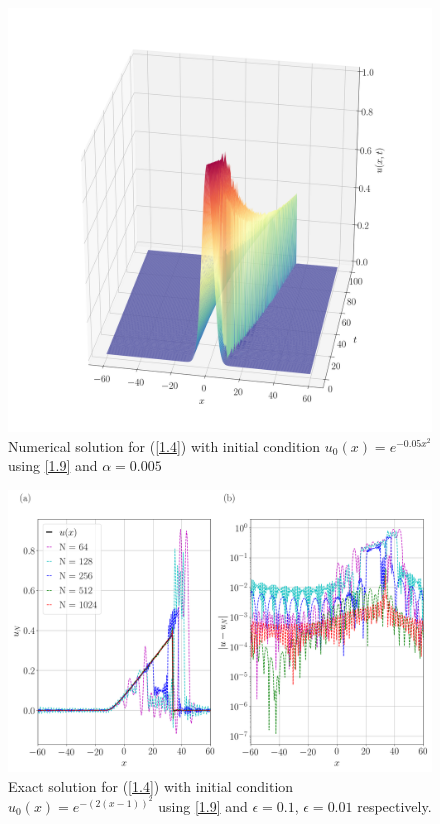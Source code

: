 	\begin{figure}
		\includegraphics[width=\textwidth]{Figures/Collocation/Graphics/eps=0.005/Numerical_Solution_alpha=0005.png}
		\caption{Numerical solution for (\ref{1.4}) with initial condition $u_0 (x) = e^{- 0.05 x^2}$ using \ref{1.9} and $\alpha = 0.005$}
		\label{Exact_Solution}
	\end{figure}
	\begin{figure}
		\includegraphics[width=\textwidth]{Figures/Collocation/Graphics/eps=0.005/Numerical_Solution_alpha=0005_T=100.png}
		\caption{Exact solution for (\ref{1.4}) with initial condition $u_0 (x) = e^{-(2(x - 1))^2}$ using \ref{1.9} and $\epsilon = 0.1$, $\epsilon = 0.01$ respectively.}
		\label{Exact_Solution}
	\end{figure}

